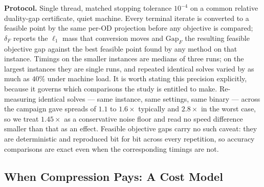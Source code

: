 \documentclass[11pt]{article}
\newif\ifshownotes \shownotesfalse
\newcommand{\conote}[1]{\ifshownotes{\color{red}\small\textsf{[Note to co-authors: #1]}}\fi}
\begin{document}
\textbf{Protocol.} Single thread, matched stopping tolerance $10^{-4}$ on a common relative
duality-gap certificate, quiet machine. Every terminal iterate is converted to a feasible
point by the same per-OD projection before any objective is compared; $\delta_F$ reports the
$\ell_1$ mass that conversion moves and $\mathrm{Gap}_F$ the resulting feasible objective
gap against the best feasible point found by any method on that instance. Timings on the
smaller instances are medians of three runs; on the largest instances they are single runs,
and repeated identical solves varied by as much as $40\%$ under machine load. It is worth
stating this precision explicitly, because it governs which comparisons the study is entitled
to make. Re-measuring identical solves --- same instance, same settings, same binary --- across
the campaign gave spreads of $1.1$ to $1.6\times$ typically and $2.8\times$ in the worst case,
so we treat $1.45\times$ as a conservative noise floor and read no speed difference smaller
than that as an effect. Feasible objective gaps carry no such caveat: they are deterministic
and reproduced bit for bit across every repetition, so accuracy comparisons are exact even when
the corresponding timings are not.

\conote{Two accounting decisions are ours to make before submission. (i) None of the reported
speedups charge the SVD or the nominal-flow computation; Referee~1 objected to exactly this
and the objection is currently unanswered. Proposal: report every ratio twice, online-only and
fully charged, with a break-even count in related solves. (ii) Large-instance timings are
single runs at $\pm40\%$; medians of three would cost roughly two machine-hours and would let
the near-parity entries be read as ordered.}


\subsection{When Compression Pays: A Cost Model}
\label{sec:cost-model}
\end{document}
